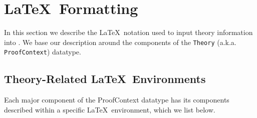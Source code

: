 \section{\LaTeX\ Formatting}

In this section we describe the \LaTeX\ notation
used to input theory information into \Saoithin.
We base our description around the components of the \texttt{Theory}
(a.k.a. \texttt{ProofContext}) datatype.

\subsection{Theory-Related \LaTeX\ Environments}

Each major component of the ProofContext datatype
has its components described within
a specific \LaTeX\ environment,
which we list below.

